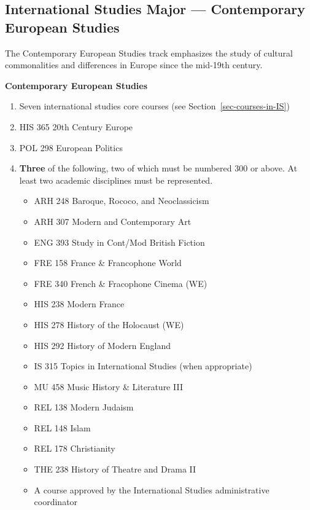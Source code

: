 \documentclass[
  letterpaper,
]{scrbook}
\providecommand{\tightlist}{%
  \setlength{\itemsep}{0pt}\setlength{\parskip}{0pt}}
\begin{document}
\subsection{International Studies Major --- Contemporary European
Studies}\label{international-studies-major-contemporary-european-studies}

The Contemporary European Studies track emphasizes the study of cultural
commonalities and differences in Europe since the mid-19th century.

\textbf{Contemporary European Studies}

\begin{enumerate}
\def\labelenumi{\arabic{enumi}.}
\tightlist
\item
  Seven international studies core courses (see
  Section~\ref{sec-courses-in-IS})
\item
  HIS 365 20th Century Europe
\item
  POL 298 European Politics
\item
  \textbf{Three} of the following, two of which must be numbered 300 or
  above. At least two academic disciplines must be represented.

  \begin{itemize}
  \tightlist
  \item
    ARH 248 Baroque, Rococo, and Neoclassicism
  \item
    ARH 307 Modern and Contemporary Art
  \item
    ENG 393 Study in Cont/Mod British Fiction
  \item
    FRE 158 France \& Francophone World
  \item
    FRE 340 French \& Fracophone Cinema (WE)
  \item
    HIS 238 Modern France
  \item
    HIS 278 History of the Holocaust (WE)
  \item
    HIS 292 History of Modern England
  \item
    IS 315 Topics in International Studies (when appropriate)
  \item
    MU 458 Music History \& Literature III
  \item
    REL 138 Modern Judaism
  \item
    REL 148 Islam
  \item
    REL 178 Christianity
  \item
    THE 238 History of Theatre and Drama II
  \item
    A course approved by the International Studies administrative
    coordinator
  \end{itemize}
\end{enumerate}
\end{document}
